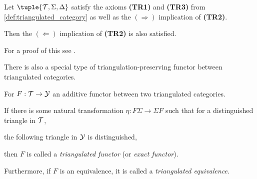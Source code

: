 \begin{lemma}
    \label{lem:triangulated_category-TR2-only_one_rotation}
    Let \( \tuple{ \Tc, \Sigma, \Delta } \) satisfy the axioms {\bf (TR1)} and {\bf (TR3)} from \autoref{def:triangulated_category} as well as the \( (\Rightarrow) \) implication of {\bf (TR2)}.

    Then the \( (\Leftarrow) \) implication of {\bf (TR2)} is also satisfied.
\end{lemma}
For a proof of this see \cite[Lemma 2.4]{May_2001}.

There is also a special type of triangulation-preserving functor between triangulated categories.
\begin{definition}
    \label{def:tri_functor}
    For \( F: {\mathcal{T}} \to {\mathcal{Y}} \) an additive functor between two triangulated categories.

    If there is some natural transformation \( \eta: F \Sigma \to \Sigma F \) such that
    for a distinguished triangle in \( {\mathcal{T}} \),
    \begin{center}
    \end{center}
    the following triangle in \( {\mathcal{Y}} \) is distinguished,
    \begin{center}
    \end{center}
    then \( F \) is called a \emph{triangulated functor} (or \emph{exact functor}).

    Furthermore, if \( F \) is an equivalence, it is called a \emph{triangulated equivalence}.
\end{definition}

